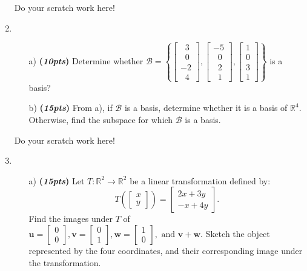 \documentclass[12pt]{article}%
\newcommand{\R}{\mathbb{R}}
\begin{document}
\begin{enumerate}
    \newpage
     Do your scratch work here!
     
    \newpage
    
    
    \item 
    \begin{itemize}
        \item[a)]\textbf{(\emph{10pts})} Determine whether   
        \( \mathcal{B} = \left\{
        \begin{bmatrix}\;\;3\\\;\;0\\-2\\\;\;4\end{bmatrix},
       \begin{bmatrix}-5\\\;\;0\\\;\;2\\\;\;1\end{bmatrix},
       \begin{bmatrix}1\\0\\3\\1\end{bmatrix}
       \right\}\)
       is a basis?

       \vspace{8cm}
    
       \item[b)]\textbf{(\emph{15pts})} From a), if \(\mathcal{B}\) is a basis, determine whether it is a basis of  \(\R^4\).
       Otherwise, find the subspace for which \(\mathcal{B}\) is a basis.
    \end{itemize}
    
    \newpage
     Do your scratch work here!
     
    \newpage
    
    \item
    \begin{itemize}
        \item[a)]\textbf{(\emph{15pts})} Let \( T: \mathbb{R}^2 \to \mathbb{R}^2 \) be a linear transformation defined by:
        \[
        T\left(\left[\begin{array}{c} x \\y \end{array}\right]\right) = 
        \left[\begin{array}{c} 2x + 3y\\ -x + 4y \end{array}\right].
        \]
        Find the images under \(T\) of  \(\mathbf{u} = \begin{bmatrix}0\\0\end{bmatrix},
        \mathbf{v}=\begin{bmatrix}0\\1\end{bmatrix}, \mathbf{w}=\begin{bmatrix}1\\0\end{bmatrix}, \text{ and } \mathbf{v} + \mathbf{w}.\)
        Sketch the object represented by the four coordinates, and their corresponding image under the transformation.
        \vspace{12cm}


\end{itemize}
\end{enumerate}
\end{document}

